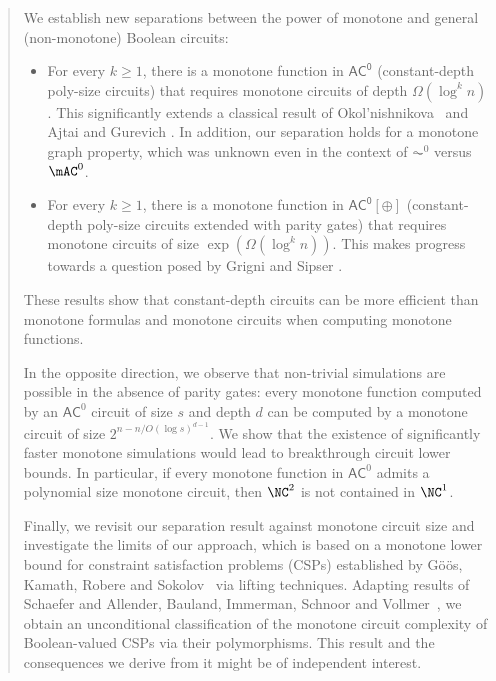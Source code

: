 \documentclass[11pt]{article}
\begin{document}
\begin{abstract}
We establish new separations between the power of monotone and general (non-monotone) Boolean circuits:
\begin{itemize}
    \item[--] For every $k \geq 1$, there is a monotone  function in
        $\mathsf{AC^0}$ (constant-depth poly-size circuits) that requires
        monotone circuits of depth $\Omega(\log^k n)$. This significantly  extends
        a classical result of Okol'nishnikova~\cite{okolnishnikova_1982}
        and Ajtai and Gurevich \citep{ajtai_gurevich_1987}. In addition, our separation holds for a monotone graph property, which was unknown even in the context of $\AC^0$ versus $\mAC^0$.  
    \item[--] For every $k \geq 1$, there is a monotone  function in
        $\mathsf{AC^0}[\oplus]$ (constant-depth poly-size circuits extended
        with parity gates) that requires monotone circuits of size
        $\exp(\Omega(\log^k n))$. This makes progress towards a question
        posed by Grigni and Sipser \citep{gs92}.  
\end{itemize}
These results show that constant-depth circuits can be more
efficient than monotone formulas and monotone circuits when computing monotone functions.

In the opposite direction, we observe that non-trivial simulations are possible in the absence of parity gates: every monotone function computed by an $\mathsf{AC}^0$ circuit of size $s$ and depth $d$ can be computed by a monotone circuit of size $2^{n - n/O(\log s)^{d-1}}$. We 
show that the
existence of significantly faster monotone simulations would lead to
breakthrough circuit lower bounds. In particular, if every monotone
function in $\mathsf{AC}^0$ admits a polynomial size monotone circuit, then $\NC^2$
is not contained in $\NC^1$.

Finally, we revisit our separation result against monotone circuit size and
investigate the limits of our approach, which is based on a monotone lower
bound for constraint satisfaction problems (CSPs)
established by 
G\"{o}\"{o}s, Kamath, Robere and Sokolov~\citep{gkrs19}
via lifting techniques. Adapting results of Schaefer
\citep{DBLP:conf/stoc/Schaefer78} and 
Allender, Bauland, Immerman, Schnoor and Vollmer~\citep{DBLP:journals/jcss/AllenderBISV09},
we obtain an unconditional classification
of the monotone circuit complexity of Boolean-valued CSPs via their
polymorphisms. This result and the consequences we derive from it might be
of independent interest. 
\end{abstract}
\end{document}
